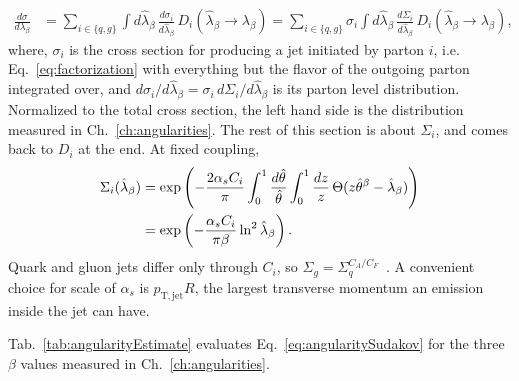 \begin{align}
	\frac{d\sigma}{d\lambda_\beta} & = \sum_{i \in \{q, g\}}\int d\hat{\lambda}_\beta\,\frac{d\sigma_i}{d\hat{\lambda}_\beta}\,D_i(\hat{\lambda}_\beta \to \lambda_\beta) = \sum_{i \in \{q, g\}}\sigma_i\int d\hat{\lambda}_\beta\,\frac{d\Sigma_i}{d\hat{\lambda}_\beta}\,D_i(\hat{\lambda}_\beta \to \lambda_\beta),
	\label{eq:angularityCumulant}
\end{align}
where, \(\sigma_i\) is the cross section for producing a jet initiated by parton \(i\), i.e. Eq.~\ref{eq:factorization} with everything but the flavor of the outgoing parton integrated over, and \(d\sigma_i/d\hat{\lambda}_\beta = \sigma_i\,d\Sigma_i/d\hat{\lambda}_\beta\) is its parton level distribution.
%
Normalized to the total cross section, the left hand side is the distribution measured in Ch.~\ref{ch:angularities}.
%
The rest of this section is about \(\Sigma_i\), and comes back to \(D_i\) at the end.
%
At fixed coupling,
\begin{align}
	\Sigma_i(\hat{\lambda}_\beta) & = \exp\left(-\frac{2\alpha_s C_i}{\pi}\int_0^1\frac{d\hat{\theta}}{\hat{\theta}}\int_0^1\frac{dz}{z}\,\Theta(z\hat{\theta}^\beta - \hat{\lambda}_\beta)\right) \notag \\
	                              & = \exp\left(-\frac{\alpha_s C_i}{\pi\beta}\ln^2\hat{\lambda}_\beta\right).
	\label{eq:angularitySudakov}
\end{align}
Quark and gluon jets differ only through \(C_i\), so \(\Sigma_g = \Sigma_q^{C_A/C_F}\)~\cite{Larkoski_2014}.
%
A convenient choice for scale of \(\alpha_s\) is \(p_\mathrm{T, jet}R\), the largest transverse momentum an emission inside the jet can have.
%

Tab.~\ref{tab:angularityEstimate} evaluates Eq.~\ref{eq:angularitySudakov} for the three \(\beta\) values measured in Ch.~\ref{ch:angularities}.

